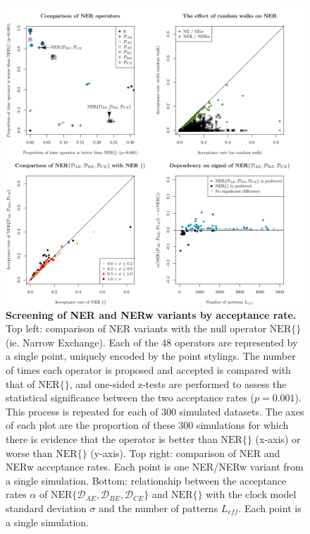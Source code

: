 \documentclass[10pt,letterpaper]{article}
\begin{document}
\begin{figure}[!h]
\includegraphics[width=\textwidth]{Figures/acceptanceRates.pdf}
\caption{\textbf{Screening of NER and NERw variants by acceptance rate.} Top left: comparison of NER variants with the null operator $\text{NER}\{\}$ (ie. Narrow Exchange). Each of the 48 operators are represented by a single point, uniquely encoded by the point stylings. The number of times each operator is proposed and accepted is compared with that of $\text{NER}\{\}$, and one-sided z-tests are performed to assess the statistical significance between the two acceptance rates ($p = 0.001$).  This process is repeated for each of $300$ simulated datasets. The axes of each plot are the proportion of these $300$ simulations for which there is evidence that the operator is better than $\text{NER}\{\}$ (x-axis) or worse than $\text{NER}\{\}$ (y-axis). Top right: comparison of NER and NERw acceptance rates. Each point is one NER/NERw variant from a single simulation. Bottom: relationship between the acceptance rates $\alpha$ of $\text{NER}\{\mathcal{D}_{AE}, \mathcal{D}_{BE}, \mathcal{D}_{CE}\}$ and $\text{NER}\{ \}$ with the clock model standard deviation $\sigma$ and the number of patterns $L_\textit{eff}$.  Each point is a single simulation. }
\label{fig:acceptanceRateScreening}
\end{figure}
\end{document}
